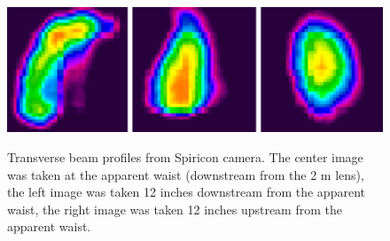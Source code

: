 \begin{figure}
\includegraphics[width=6.00in]
{spiricon/spiricon.png}\\
\caption[Transverse beam profiles from Spiricon camera]{Transverse beam profiles from Spiricon camera. The center image was taken at the apparent waist (downstream from the 2 m lens), the left image was taken 12 inches downstream from the apparent waist, the right image was taken 12 inches upstream from the apparent waist.}
\label{spiricon}
\end{figure} 
